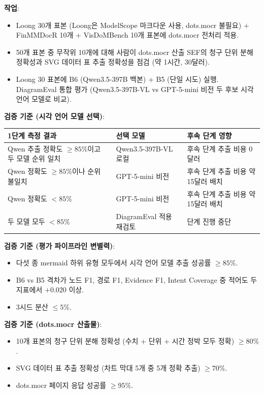 \documentclass[11pt]{article}
\begin{document}
\textbf{작업}:
\begin{itemize}[leftmargin=*]
    \item Loong 30개 표본 (Loong은 ModelScope 마크다운 사용, dots.mocr 불필요) + FinMMDocR 10개 + VisDoMBench 10개 표본에 dots.mocr 전처리 적용.
    \item 50개 표본 중 무작위 10개에 대해 사람이 dots.mocr 산출 SEF의 청구 단위 분해 정확성과 SVG 데이터 표 추출 정확성을 점검 (약 1시간, 30달러).
    \item Loong 30 표본에 B6 (Qwen3.5-397B 백본) + B5 (단일 시도) 실행. DiagramEval 통합 평가 (Qwen3.5-397B-VL vs GPT-5-mini 비전 두 후보 시각 언어 모델로 비교).
\end{itemize}

\textbf{검증 기준 (시각 언어 모델 선택)}:

\begin{table}[h]
\centering
\small
\begin{tabular}{lp{6.5cm}l}
\toprule
1단계 측정 결과 & 선택 모델 & 후속 단계 영향 \\
\midrule
Qwen 추출 정확도 $\geq 85\%$이고 두 모델 순위 일치 & Qwen3.5-397B-VL 로컬 & 후속 단계 추출 비용 0달러 \\
Qwen 정확도 $\geq 85\%$이나 순위 불일치 & GPT-5-mini 비전 & 후속 단계 추출 비용 약 15달러 배치 \\
Qwen 정확도 $< 85\%$ & GPT-5-mini 비전 & 후속 단계 추출 비용 약 15달러 배치 \\
두 모델 모두 $< 85\%$ & DiagramEval 적용 재검토 & 단계 진행 중단 \\
\bottomrule
\end{tabular}
\end{table}

\textbf{검증 기준 (평가 파이프라인 변별력)}:
\begin{itemize}[leftmargin=*]
    \item 다섯 종 mermaid 하위 유형 모두에서 시각 언어 모델 추출 성공률 $\geq 85\%$.
    \item B6 vs B5 격차가 노드 F1, 경로 F1, Evidence F1, Intent Coverage 중 적어도 두 지표에서 $+0.020$ 이상.
    \item 3시드 분산 $\leq 5\%$.
\end{itemize}

\textbf{검증 기준 (dots.mocr 산출물)}:
\begin{itemize}[leftmargin=*]
    \item 10개 표본의 청구 단위 분해 정확성 (수치 + 단위 + 시간 정박 모두 정확) $\geq 80\%$.
    \item SVG 데이터 표 추출 정확성 (차트 막대 5개 중 5개 정확 추출) $\geq 70\%$.
    \item dots.mocr 페이지 응답 성공률 $\geq 95\%$.
\end{itemize}
\end{document}
